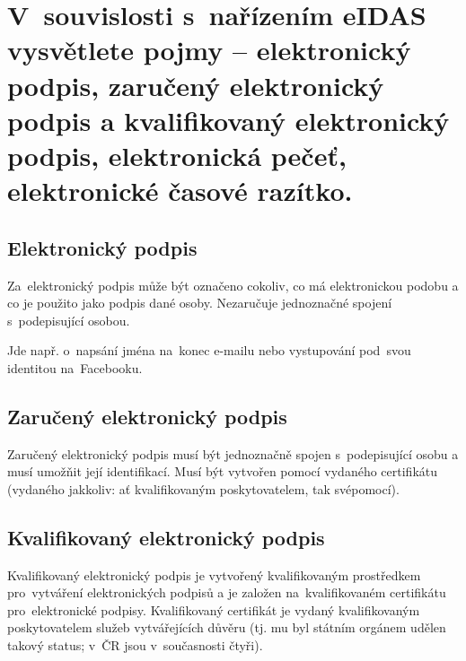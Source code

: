 

\clearpage
\section{V~souvislosti s~nařízením eIDAS vysvětlete pojmy -- elektronický podpis, zaručený elektronický podpis a kvalifikovaný elektronický podpis, elektronická pečeť, elektronické časové razítko.}

\subsection{Elektronický podpis}

Za~elektronický podpis může být označeno cokoliv, co má elektronickou podobu a co je použito jako podpis dané osoby.
Nezaručuje jednoznačné spojení s~podepisující osobou.

Jde např. o~napsání jména na~konec e-mailu nebo vystupování pod~svou identitou na~Facebooku.


\subsection{Zaručený elektronický podpis}

Zaručený elektronický podpis musí být jednoznačně spojen s~podepisující osobu a musí umožňit její identifikací.
Musí být vytvořen pomocí vydaného certifikátu (vydaného jakkoliv: ať kvalifikovaným poskytovatelem, tak svépomocí).


\subsection{Kvalifikovaný elektronický podpis}

Kvalifikovaný elektronický podpis je vytvořený kvalifikovaným prostředkem pro~vytváření elektronických podpisů a je založen na~kvalifikovaném certifikátu pro~elektronické podpisy.
Kvalifikovaný certifikát je vydaný kvalifikovaným poskytovatelem služeb vytvářejících důvěru (tj. mu byl státním orgánem udělen takový status; v~ČR jsou v~současnosti čtyři).

